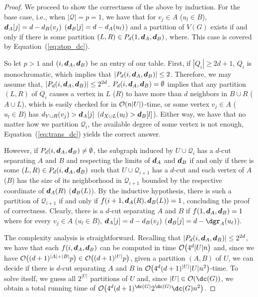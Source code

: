 \begin{proof}
    We proceed to show the correctness of the above by induction.
    For the base case, i.e., when $|\mathcal{Q}| = p = 1$, we have that for $v_j \in A$ ($u_l \in B$),  $\boldsymbol{d}_A[j] = d - d_B(v_j)$ ($\boldsymbol{d}_B[j] = d - d_A(u_l)$) and a partition of $V(G)$ exists if and only if there is some partition $(L, R) \in P_d(1, \boldsymbol{d}_A, \boldsymbol{d}_B)$, where.
    This case is covered by Equation~(\ref{eq:stop_dc}).

    So let $p > 1$ and $(i, \boldsymbol{d}_A, \boldsymbol{d}_B)$ be an entry of our table.
    First, if $|Q_i| \geq 2d+1$, $Q_i$ is monochromatic, which implies that $|P_d(i, \boldsymbol{d}_A, \boldsymbol{d}_B)| \leq 2$.
    Therefore, we may assume that, $|P_d(i, \boldsymbol{d}_A, \boldsymbol{d}_B)| \leq 2^{2d}$.
    $P_d(i, \boldsymbol{d}_A, \boldsymbol{d}_B) = \emptyset$ implies that any partition $(L, R)$ of $Q_i$ causes a vertex in $L$ ($R$) to have more than $d$ neighbors in $B \cup R$ ($A \cup L$), which is easily checked for in $\mathcal{O}\!\left(n|U|\right)$-time, or some vertex $v_j \in A$ ($u_l \in B$) has $d_{Y \cup R}(v_j) > \boldsymbol{d}_A[j]$ ($d_{X \cup L}(u_l) > \boldsymbol{d}_B[l]$).
    Either way, we have that no matter how we partition $\mathcal{Q}_i$, the available degree of some vertex is not enough, Equation~(\ref{eq:trans_dc}) yields the correct answer.

    However, if $P_d(i, \boldsymbol{d}_A, \boldsymbol{d}_B) \neq \emptyset$, the subgraph induced by $U \cup \mathcal{Q}_i$ has a $d$-cut separating $A$ and $B$ and respecting the limits of $\boldsymbol{d}_A$ and $\boldsymbol{d}_B$ if and only if there is some $(L, R) \in P_d(i, \boldsymbol{d}_A, \boldsymbol{d}_B)$ such that $U \cup \mathcal{Q}_{i+1}$ has a $d$-cut and each vertex of $A$ ($B$) has the size of its neighborhood in $\mathcal{Q}_{i+1}$ bounded by the respective coordinate of $\boldsymbol{d}_A(R)$ ($\boldsymbol{d}_B(L)$).
    By the inductive hypothesis, there is such a partition of $\mathcal{Q}_{i+1}$ if and only if $f(i+1, \boldsymbol{d}_A(R), \boldsymbol{d}_B(L)) = 1$, concluding the proof of correctness.
    Clearly, there is a $d$-cut separating $A$ and $B$ if $f(1, \boldsymbol{d}_A, \boldsymbol{d}_B) = 1$ where for every $v_j \in A$ ($u_l \in B$),  $\boldsymbol{d}_A[j] = d - d_B(v_j)$ ($\bmd_B[j] = d - \dgr_A(u_{\ell})$).

    The complexity analysis is straightforward.
    Recalling that $|P_d(i, \boldsymbol{d}_A, \boldsymbol{d}_B)| \leq 2^{2d}$, we have that each $f(i, \boldsymbol{d}_A, \boldsymbol{d}_B)$ can be computed in time $\mathcal{O}\!\left(4^d|U|n\right)$ and, since we have $\mathcal{O}\!\left((d+1)^{|A| + |B|}p\right) \in \mathcal{O}\!\left((d+1)^{|U|}p\right)$, given a partition $(A, B)$ of $U$, we can decide if there is $d$-cut separating $A$ and $B$ in $\mathcal{O}\!\left(4^d(d+1)^{|U|}|U|n^2\right)$-time.
    To solve  itself, we guess all $2^{|U|}$ partitions of $U$ and, since $|U| \in \bigO{\dc(G)}$, we obtain a total running time of $\bigO{4^d(d+1)^{\dc(G)}2^{\dc(G)}\dc(G)n^2}$.
\end{proof}

